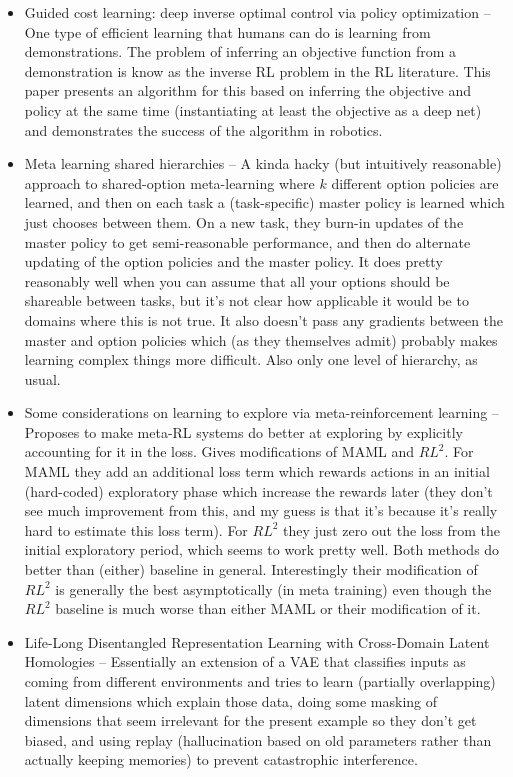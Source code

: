 \documentclass[10pt]{article}
\begin{document}
\begin{itemize}
\item Guided cost learning: deep inverse optimal control via policy optimization -- One type of efficient learning that humans can do is learning from demonstrations. The problem of inferring an objective function from a demonstration is know as the inverse RL problem in the RL literature. This paper presents an algorithm for this based on inferring the objective and policy at the same time (instantiating at least the objective as a deep net) and demonstrates the success of the algorithm in robotics. \citep{Finn2016}
\item Meta learning shared hierarchies -- A kinda hacky (but intuitively reasonable) approach to shared-option meta-learning where \(k\) different option policies are learned, and then on each task a (task-specific) master policy is learned which just chooses between them. On a new task, they burn-in updates of the master policy to get semi-reasonable performance, and then do alternate updating of the option policies and the master policy. It does pretty reasonably well when you can assume that all your options should be shareable between tasks, but it's not clear how applicable it would be to domains where this is not true. It also doesn't pass any gradients between the master and option policies which (as they themselves admit) probably makes learning complex things more difficult. Also only one level of hierarchy, as usual. \citep{Frans2018} 
\item Some considerations on learning to explore via meta-reinforcement learning -- Proposes to make meta-RL systems do better at exploring by explicitly accounting for it in the loss. Gives modifications of MAML and $RL^2$. For MAML they add an additional loss term which rewards actions in an initial (hard-coded) exploratory phase which increase the rewards later (they don't see much improvement from this, and my guess is that it's because it's really hard to estimate this loss term). For $RL^2$ they just zero out the loss from the initial exploratory period, which seems to work pretty well. Both methods do better than (either) baseline in general. Interestingly their modification of $RL^2$ is generally the best asymptotically (in meta training) even though the $RL^2$ baseline is much worse than either MAML or their modification of it.
\item Life-Long Disentangled Representation Learning with Cross-Domain Latent Homologies -- Essentially an extension of a VAE that classifies inputs as coming from different environments and tries to learn (partially overlapping) latent dimensions which explain those data, doing some masking of dimensions that seem irrelevant for the present example so they don't get biased, and using replay (hallucination based on old parameters rather than actually keeping memories) to prevent catastrophic interference. \citep{Achille2018}

\end{itemize}
\end{document}
